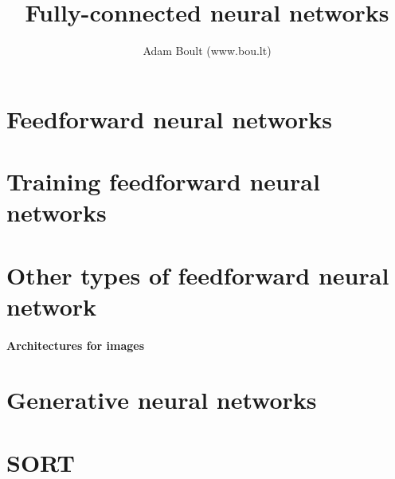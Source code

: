 \documentclass[oneside]{book}
\begin{document}
\author{Adam Boult (www.bou.lt)}
\title{Fully-connected neural networks}
\maketitle

\setcounter{tocdepth}{0}
\tableofcontents



\part{Feedforward neural networks}



\part{Training feedforward neural networks}







\part{Other types of feedforward neural network}


\subsection{Architectures for images}


\part{Generative neural networks}





\part{SORT}

\end{document}
